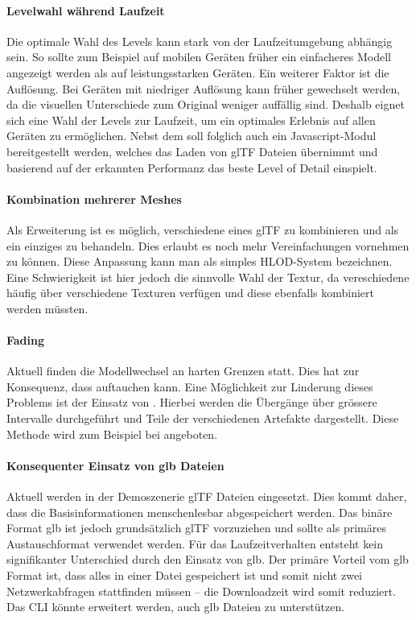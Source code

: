 \paragraph{Levelwahl während Laufzeit}
Die optimale Wahl des Levels kann stark von der Laufzeitumgebung abhängig sein. So sollte zum Beispiel auf mobilen Geräten früher ein einfacheres Modell angezeigt werden als auf leistungsstarken Geräten. Ein weiterer Faktor ist die Auflösung. Bei Geräten mit niedriger Auflösung kann früher gewechselt werden, da die visuellen Unterschiede zum Original weniger auffällig sind.
Deshalb eignet sich eine Wahl der Levels zur Laufzeit, um ein optimales Erlebnis auf allen Geräten zu ermöglichen.
Nebst dem  soll folglich auch ein Javascript-Modul bereitgestellt werden, welches das Laden von glTF Dateien übernimmt und basierend auf der erkannten Performanz das beste Level of Detail einspielt.

\paragraph{Kombination mehrerer Meshes}
Als Erweiterung ist es möglich, verschiedene  eines glTF zu kombinieren und als ein einziges  zu behandeln. Dies erlaubt es noch mehr Vereinfachungen vornehmen zu können. Diese Anpassung kann man als simples HLOD-System bezeichnen. Eine Schwierigkeit ist hier jedoch die sinnvolle Wahl der Textur, da vereschiedene  häufig über verschiedene Texturen verfügen und diese ebenfalls kombiniert werden müssten.

\paragraph{Fading}
\label{chap:fading}
Aktuell finden die Modellwechsel an harten Grenzen statt. Dies hat zur Konsequenz, dass  auftauchen kann. Eine Möglichkeit zur Linderung dieses Problems ist der Einsatz von . Hierbei werden die Übergänge über grössere Intervalle durchgeführt und Teile der verschiedenen Artefakte dargestellt. Diese Methode wird zum Beispiel bei  angeboten.

\paragraph{Konsequenter Einsatz von glb Dateien}
Aktuell werden in der Demoszenerie glTF Dateien eingesetzt. Dies kommt daher, dass die Basisinformationen menschenlesbar abgespeichert werden. Das binäre Format glb ist jedoch grundsätzlich glTF vorzuziehen und sollte als primäres Austauschformat verwendet werden. Für das Laufzeitverhalten entsteht kein signifikanter Unterschied durch den Einsatz von glb. Der primäre Vorteil vom glb Format ist, dass alles in einer Datei gespeichert ist und somit nicht zwei Netzwerkabfragen stattfinden müssen – die Download\-zeit wird somit reduziert. Das CLI könnte erweitert werden, auch glb Dateien zu unterstützen.
